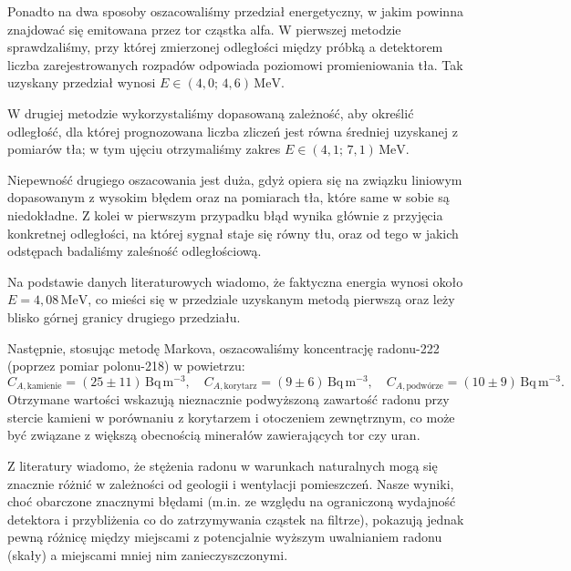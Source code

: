 \documentclass[12pt]{article}
\begin{document}
Ponadto na dwa sposoby oszacowaliśmy przedział energetyczny, w jakim powinna znajdować się emitowana przez tor cząstka alfa. W pierwszej metodzie sprawdzaliśmy, przy której zmierzonej odległości między próbką a detektorem liczba zarejestrowanych rozpadów odpowiada poziomowi promieniowania tła. Tak uzyskany przedział wynosi $E \in (4{,}0;\,4{,}6)\,\mathrm{MeV}$.

W drugiej metodzie wykorzystaliśmy dopasowaną zależność, aby określić odległość, dla której prognozowana liczba zliczeń jest równa średniej uzyskanej z pomiarów tła; w tym ujęciu otrzymaliśmy zakres $E \in (4{,}1;\,7{,}1)\,\mathrm{MeV}$.

Niepewność drugiego oszacowania jest duża, gdyż opiera się na związku liniowym dopasowanym z wysokim błędem oraz na pomiarach tła, które same w sobie są niedokładne. Z kolei w pierwszym przypadku błąd wynika głównie z przyjęcia konkretnej odległości, na której sygnał staje się równy tłu, oraz od tego w jakich odstępach badaliśmy zaleśność odległościową.

Na podstawie danych literaturowych \cite{alpha_energy} wiadomo, że faktyczna energia wynosi około $E = 4{,}08\,\mathrm{MeV}$, co mieści się w przedziale uzyskanym metodą pierwszą oraz leży blisko górnej granicy drugiego przedziału.

Następnie, stosując metodę Markova, oszacowaliśmy koncentrację radonu-222 (poprzez pomiar polonu-218) w powietrzu:
\[
	C_{A,\text{kamienie}}=(25 \pm 11)\,\mathrm{Bq\,m^{-3}},
	\quad
	C_{A,\text{korytarz}}=(9 \pm 6)\,\mathrm{Bq\,m^{-3}},
	\quad
	C_{A,\text{podwórze}}=(10 \pm 9)\,\mathrm{Bq\,m^{-3}}.
\]
Otrzymane wartości wskazują nieznacznie podwyższoną zawartość radonu przy stercie kamieni w porównaniu z korytarzem i otoczeniem zewnętrznym, co może być związane z większą obecnością minerałów zawierających tor czy uran.

Z literatury \cite{concentration} wiadomo, że stężenia radonu w warunkach naturalnych mogą się znacznie różnić w zależności od geologii i wentylacji pomieszczeń. Nasze wyniki, choć obarczone znacznymi błędami (m.in. ze względu na ograniczoną wydajność detektora i przybliżenia co do zatrzymywania cząstek na filtrze), pokazują jednak pewną różnicę między miejscami z potencjalnie wyższym uwalnianiem radonu (skały) a miejscami mniej nim zanieczyszczonymi.

\newpage
\end{document}
